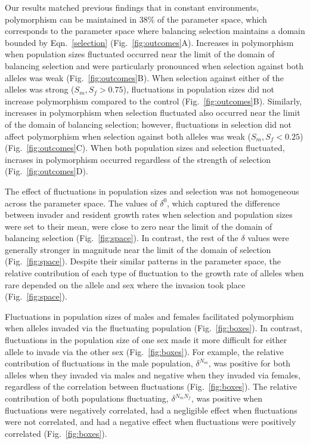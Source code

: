 \documentclass[12pt]{article}
\begin{document}
Our results matched previous findings that in constant environments, polymorphism can be maintained in $38\%$ of the parameter space, which corresponds to the parameter space where balancing selection maintains a domain bounded by Eqn.~\ref{selection} (Fig.~\ref{fig:outcomes}A). Increases in polymorphism when population sizes fluctuated occurred near the limit of the domain of balancing selection and were particularly pronounced when selection against both alleles was weak (Fig.~\ref{fig:outcomes}B). When selection against either of the alleles was strong ($ S_{m}, S_{f}> 0.75 $), fluctuations in population sizes did not increase polymorphism compared to the control (Fig.~\ref{fig:outcomes}B). Similarly, increases in polymorphism when selection fluctuated also occurred near the limit of the domain of balancing selection; however, fluctuations in selection did not affect polymorphism when selection against both alleles was weak ($ S_{m}, S_{f}< 0.25 $) (Fig.~\ref{fig:outcomes}C). When both population sizes and selection fluctuated, incrases in polymorphism occurred regardless of the strength of selection (Fig.~\ref{fig:outcomes}D).

The effect of fluctuations in population sizes and selection was not homogeneous across the parameter space. The values of $\delta^{0}$, which captured the difference between invader and resident growth rates when selection and population sizes were set to their mean, were close to zero near the limit of the domain of balancing selection (Fig.~\ref{fig:space}). In contrast, the rest of the $\delta$ values were generally stronger in magnitude near the limit of the domain of selection  (Fig.~\ref{fig:space}). Despite their similar patterns in the parameter space, the relative contribution of each type of fluctuation to the growth rate of alleles when rare depended on the allele and sex where the invasion took place (Fig.~\ref{fig:space}).

Fluctuations in population sizes of males and females facilitated polymorphism when alleles invaded via the fluctuating population (Fig.~\ref{fig:boxes}). In contrast, fluctuations in the population size of one sex made it more difficult for either allele to invade via the other sex (Fig.~\ref{fig:boxes}). For example, the relative contribution of fluctuations in the male population, $\delta^{N_{m}}$, was positive for both alleles when they invaded via males and negative when they invaded via females, regardless of the correlation between fluctuations (Fig.~\ref{fig:boxes}). The relative contribution of both populations fluctuating,  $\delta^{N_{m}N_{f}}$, was positive when fluctuations were negatively correlated, had a negligible effect when fluctuations were not correlated, and had a negative effect when fluctuations were positively correlated (Fig.~\ref{fig:boxes}).
\end{document}
